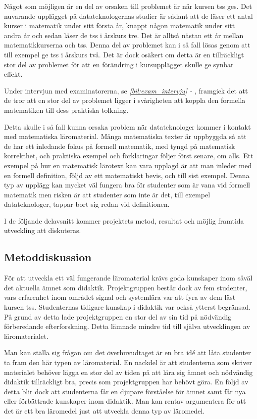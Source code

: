 \documentclass[12pt,a4paper,twoside,openright]{article}
\begin{document}
Något som möjligen är en del av orsaken till problemet är när kursen
\gls{tss} ges. Det nuvarande upplägget på datateknologernas studier
är sådant att de läser ett antal kurser i matematik under sitt första
år, knappt någon matematik under sitt andra år och sedan läser de
\gls{tss} i årskurs tre. Det är alltså nästan ett år mellan
matematikkurserna och \gls{tss}. Denna del av problemet kan i så
fall lösas genom att till exempel ge \gls{tss} i årskurs två. Det är dock
osäkert om detta är en tillräckligt stor del av problemet för att en
förändring i kursupplägget skulle ge synbar effekt.

Under intervjun med examinatorerna, se \textit{\ref{bil:exam_intervju}
  - }, framgick det att de tror att en stor
del av problemet ligger i svårigheten att koppla den formella
matematiken till dess praktiska tolkning.

Detta skulle i så fall kunna orsaka problem när datateknologer kommer
i kontakt med matematiska läromaterial. Många matematiska texter är
uppbyggda så att de har ett inledande fokus på formell matematik, med
tyngd på matematisk korrekthet, och praktiska exempel och förklaringar
följer först senare, om alls. Ett exempel på hur en matematisk
lärotext kan vara upplagd är att man inleder med en formell
definition, följd av ett matematiskt bevis, och till sist
exempel. Denna typ av upplägg kan mycket väl fungera bra för studenter
som är vana vid formell matematik men risken är att studenter som inte
är det, till exempel datateknologer, tappar bort sig redan vid
definitionen.

I de följande delavsnitt kommer projektets metod, resultat och möjlig
framtida utveckling att diskuteras.

\subsection{Metoddiskussion}
\label{sec:metDisk}
För att utveckla ett väl fungerande läromaterial krävs goda kunskaper
inom såväl det aktuella ämnet som didaktik. Projektgruppen består dock
av fem studenter, vars erfarenhet inom området signal och systemlära
var att fyra av dem läst kursen \gls{tss}. Studenternas tidigare
kunskap i didaktik var också ytterst begränsad. På grund av detta lade
projekt\-gruppen en stor del av sin tid på nödvändig förberedande
efterforskning. Detta lämnade mindre tid till själva utvecklingen av
läromaterialet.

Man kan ställa sig frågan om det överhuvudtaget är en bra idé att låta
studenter ta fram den här typen av läromaterial. En nackdel är att
studenterna som skriver materialet behöver lägga en stor del av tiden
på att lära sig ämnet och nödvändig didaktik tillräckligt bra, precis
som projektgruppen har behövt göra.  En följd av detta blir dock att
studenterna får en djupare förståelse för ämnet samt får nya eller
förbättrade kunskaper inom didaktik.  Man kan rentav argumentera för
att det är ett bra läromedel just att utveckla denna typ av läromedel.
\end{document}
